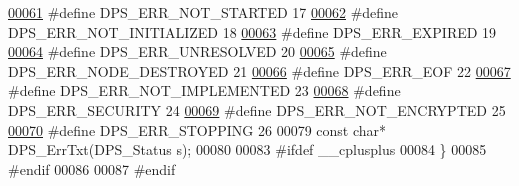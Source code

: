 \begin{DoxyCode}
\hyperlink{group__status_ga40f77c0ef70f691e6e158c8756ad8895}{00061} \textcolor{preprocessor}{#define DPS\_ERR\_NOT\_STARTED       17 }
\hyperlink{group__status_ga92b1c68aa4f1526347ccb76aa9382d76}{00062} \textcolor{preprocessor}{#define DPS\_ERR\_NOT\_INITIALIZED   18 }
\hyperlink{group__status_ga45240d9b5760ba1a30ad0bee0a6d2b7c}{00063} \textcolor{preprocessor}{#define DPS\_ERR\_EXPIRED           19 }
\hyperlink{group__status_gab1a09e3fc51905cc823298f964ad60e6}{00064} \textcolor{preprocessor}{#define DPS\_ERR\_UNRESOLVED        20 }
\hyperlink{group__status_ga9047d1e219f2a62a948845d922582ec5}{00065} \textcolor{preprocessor}{#define DPS\_ERR\_NODE\_DESTROYED    21 }
\hyperlink{group__status_ga40b286792608c99ed5dffd1caca9f569}{00066} \textcolor{preprocessor}{#define DPS\_ERR\_EOF               22 }
\hyperlink{group__status_gad175cd9050dec5f3a214bc62c3c7473c}{00067} \textcolor{preprocessor}{#define DPS\_ERR\_NOT\_IMPLEMENTED   23 }
\hyperlink{group__status_gaa3bb7fee9a4a926de2df54a272446b5c}{00068} \textcolor{preprocessor}{#define DPS\_ERR\_SECURITY          24 }
\hyperlink{group__status_gac13dac4973f6700ff95461171148c1c8}{00069} \textcolor{preprocessor}{#define DPS\_ERR\_NOT\_ENCRYPTED     25 }
\hyperlink{group__status_ga87337c85a55fcaf2dbaaf128362f6c8c}{00070} \textcolor{preprocessor}{#define DPS\_ERR\_STOPPING          26 }
00079 \textcolor{preprocessor}{const char* DPS\_ErrTxt(DPS\_Status s);}
00080 
00083 \textcolor{preprocessor}{#ifdef \_\_cplusplus}
00084 \}
00085 \textcolor{preprocessor}{#endif}
00086 
00087 \textcolor{preprocessor}{#endif}
\end{DoxyCode}
